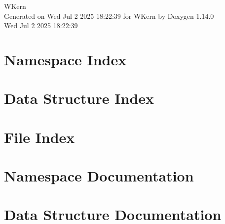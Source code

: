 \documentclass[twoside]{book}
\newcommand{\+}{\discretionary{\mbox{\scriptsize$\hookleftarrow$}}{}{}}
\newcommand{\clearemptydoublepage}{%
    \newpage{\pagestyle{empty}\cleardoublepage}%
  }
\begin{document}
  \raggedbottom
    \hypersetup{pageanchor=false,
                bookmarksnumbered=true,
                pdfencoding=unicode
               }
  \begin{titlepage}
  \vspace*{7cm}
  \begin{center}%
  {\Large WKern}\\
  \vspace*{1cm}
  {\large Generated on Wed Jul 2 2025 18\+:22\+:39 for WKern by Doxygen 1.14.0}\\
    \vspace*{0.5cm}
    {\small Wed Jul 2 2025 18:22:39}
  \end{center}
  \end{titlepage}
  \clearemptydoublepage
  \tableofcontents
  \clearemptydoublepage
  \hypersetup{pageanchor=true}
\chapter{Namespace Index}

\chapter{Data Structure Index}

\chapter{File Index}

\chapter{Namespace Documentation}







\chapter{Data Structure Documentation}














\end{document}
